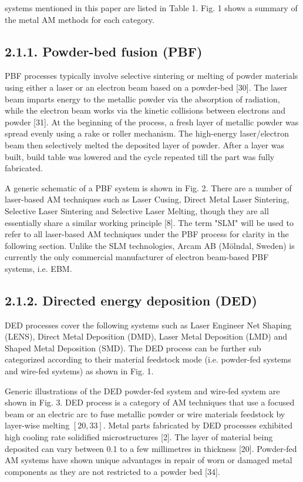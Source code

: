 \documentclass[10pt]{article}
\begin{document}
systems mentioned in this paper are listed in Table 1. Fig. 1 shows a summary of the metal AM methods for each category.

\subsection*{2.1.1. Powder-bed fusion (PBF)}
PBF processes typically involve selective sintering or melting of powder materials using either a laser or an electron beam based on a powder-bed [30]. The laser beam imparts energy to the metallic powder via the absorption of radiation, while the electron beam works via the kinetic collisions between electrons and powder [31]. At the beginning of the process, a fresh layer of metallic powder was spread evenly using a rake or roller mechanism. The high-energy laser/electron beam then selectively melted the deposited layer of powder. After a layer was built, build table was lowered and the cycle repeated till the part was fully fabricated.

A generic schematic of a PBF system is shown in Fig. 2. There are a number of laser-based AM techniques such as Laser Cusing, Direct Metal Laser Sintering, Selective Laser Sintering and Selective Laser Melting, though they are all essentially share a similar working principle [8]. The term "SLM" will be used to refer to all laser-based AM techniques under the PBF process for clarity in the following section. Unlike the SLM technologies, Arcam AB (Mölndal, Sweden) is currently the only commercial manufacturer of electron beam-based PBF systems, i.e. EBM.

\subsection*{2.1.2. Directed energy deposition (DED)}
DED processes cover the following systems such as Laser Engineer Net Shaping (LENS), Direct Metal Deposition (DMD), Laser Metal Deposition (LMD) and Shaped Metal Deposition (SMD). The DED process can be further sub categorized according to their material feedstock mode (i.e. powder-fed systems and wire-fed systems) as shown in Fig. 1.

Generic illustrations of the DED powder-fed system and wire-fed system are shown in Fig. 3. DED process is a category of AM techniques that use a focused beam or an electric arc to fuse metallic powder or wire materials feedstock by layer-wise melting $[20,33]$. Metal parts fabricated by DED processes exhibited high cooling rate solidified microstructures [2]. The layer of material being deposited can vary between 0.1 to a few millimetres in thickness [20]. Powder-fed AM systems have shown unique advantages in repair of worn or damaged metal components as they are not restricted to a powder bed [34].
\end{document}

